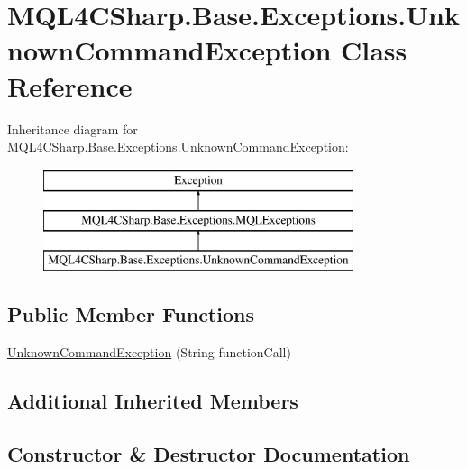 \hypertarget{class_m_q_l4_c_sharp_1_1_base_1_1_exceptions_1_1_unknown_command_exception}{}\section{M\+Q\+L4\+C\+Sharp.\+Base.\+Exceptions.\+Unknown\+Command\+Exception Class Reference}
\label{class_m_q_l4_c_sharp_1_1_base_1_1_exceptions_1_1_unknown_command_exception}
Inheritance diagram for M\+Q\+L4\+C\+Sharp.\+Base.\+Exceptions.\+Unknown\+Command\+Exception\+:\begin{figure}[H]
\begin{center}
\leavevmode
\includegraphics[height=3.000000cm]{class_m_q_l4_c_sharp_1_1_base_1_1_exceptions_1_1_unknown_command_exception}
\end{center}
\end{figure}
\subsection*{Public Member Functions}
\begin{DoxyCompactItemize}
\item 
\hyperlink{class_m_q_l4_c_sharp_1_1_base_1_1_exceptions_1_1_unknown_command_exception_ae12ce839ee23289c1a62b2b29ab87736}{Unknown\+Command\+Exception} (String function\+Call)
\end{DoxyCompactItemize}
\subsection*{Additional Inherited Members}


\subsection{Constructor \& Destructor Documentation}
